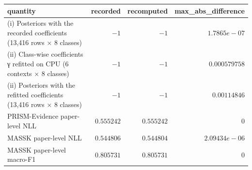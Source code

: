 \begin{tabular}{lrrr}
\toprule
quantity & recorded & recomputed & max\_abs\_difference \\
\midrule
(i) Posteriors with the recorded coefficients (13,416 rows × 8 classes) & $-1$ & $-1$ & $1.7865e-07$ \\
(ii) Class-wise coefficients γ refitted on CPU (6 contexts × 8 classes) & $-1$ & $-1$ & $0.000579758$ \\
(ii) Posteriors with the refitted coefficients (13,416 rows × 8 classes) & $-1$ & $-1$ & $0.00114846$ \\
PRISM-Evidence paper-level NLL & $0.555242$ & $0.555242$ & $0$ \\
MASSK paper-level NLL & $0.544806$ & $0.544804$ & $2.09434e-06$ \\
MASSK paper-level macro-F1 & $0.805731$ & $0.805731$ & $0$ \\
\bottomrule
\end{tabular}
